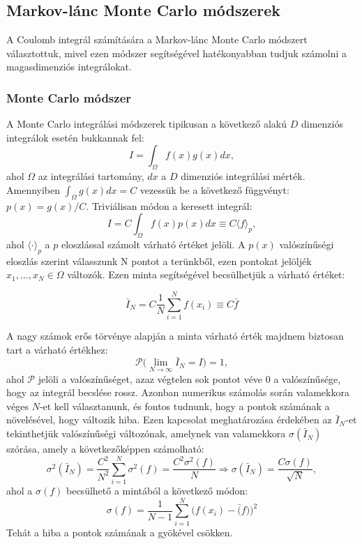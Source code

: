 \documentclass[10pt,a4paper]{article}
\numberwithin{equation}{subsection}
\numberwithin{figure}{section}
\begin{document}
\subsection{Markov-lánc Monte Carlo módszerek}

A Coulomb integrál számítására a Markov-lánc Monte Carlo módszert választottuk, mivel ezen módszer segítségével hatékonyabban tudjuk számolni a magasdimenziós integrálokat.

\subsubsection{Monte Carlo módszer}

A Monte Carlo integrálási módszerek tipikusan a következő alakú  $D$ dimenziós integrálok esetén bukkannak fel:
\begin{equation}
I=\int_\Omega f(x)g(x) dx,
\end{equation}
ahol $\Omega$ az integrálási tartomány, $dx$ a $D$ dimenziós integrálási mérték. Amennyiben $\int_\Omega g(x)dx = C$ vezessük be a következő függvényt: $p(x)=g(x)/C$. Triviálisan módon a keresett integrál: 
\begin{equation}
I=C\int_\Omega f(x)p(x)dx \equiv C\langle f \rangle_p,
\end{equation}
ahol  $\langle \cdot \rangle_p$ a $p$ eloszlással számolt várható értéket jelöli.
A $p(x)$ valószínűségi eloszlás szerint válasszunk N pontot a terünkből, ezen pontokat jelöljék $x_1,\dots,x_N\in\Omega$ változók. Ezen minta segítségével becsülhetjük a várható értéket:

\begin{equation}
\bar{I}_N = C\frac{1}{N}\sum_{i=1}^N f(x_i)\equiv C\bar{f}
\label{eq:IN}
\end{equation} 

A nagy számok erős törvénye alapján a minta várható érték majdnem biztosan tart a várható értékhez:
\begin{equation}
\mathcal{P}\Big(\lim_{N\rightarrow\infty}\bar{I}_N=I\Big)=1,
\end{equation}
ahol $\mathcal{P}$ jelöli a valószínűséget, azaz végtelen sok pontot véve $0$ a valószínűsége, hogy az integrál becslése rossz. Azonban numerikus számolás során valamekkora véges $N$-et kell választanunk, és fontos tudnunk, hogy a pontok számának a növelésével, hogy változik hiba. Ezen kapcsolat meghatározása érdekében az $\bar{I}_{N}$-et tekinthetjük valószínűségi változónak, amelynek van valamekkora $\sigma({\bar{I}_N})$ szórása, amely a következőképpen számolható:
\begin{equation}
\sigma^2({\bar{I}_N})=\frac{C^2}{N^2}\sum_{i=1}^N\sigma^2(f)=\frac{C^2\sigma^2(f)}{N}\Longrightarrow \sigma(\bar{I}_N)=\frac{C\sigma(f)}{\sqrt{N}},
\end{equation}
ahol a $\sigma(f)$ becsülhető a mintából a következő módon:
\begin{equation}
\sigma(f)=\frac{1}{N-1}\sum_{i=1}^N\big(f(x_i)-\bar(f)\big)^2
\end{equation}
Tehát a hiba a pontok számának a gyökével csökken.
\end{document}
